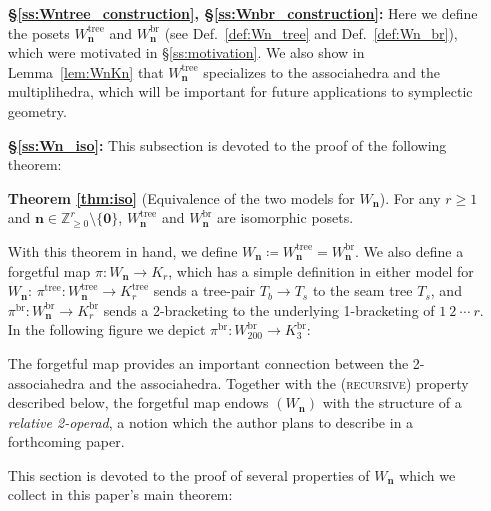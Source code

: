 \documentclass[11pt]{amsart}
\theoremstyle{definition}
\theoremstyle{remark}
\theoremstyle{plain}
\newcommand{\bZ}{\mathbb{Z}}
\newcommand\bn{\mathbf{n}}
\newcommand\bzero{\mathbf{0}}
\newcommand{\on}{\operatorname}
\newcommand{\tree}{{\on{tree}}}
\newcommand{\br}{{\on{br}}}
\begin{document}
\begin{enumerate}
\item[\bf\S\ref{ss:Wntree_construction}, \bf\S\ref{ss:Wnbr_construction}:]
Here we define the posets $W_\bn^\tree$ and $W_\bn^\br$ (see Def.~\ref{def:Wn_tree} and Def.~\ref{def:Wn_br}), which were motivated in \S\ref{ss:motivation}.
We also show in Lemma~\ref{lem:WnKn} that $W_\bn^\tree$ specializes to the associahedra and the multiplihedra, which will be important for future applications to symplectic geometry.

\medskip

\item[\bf\S\ref{ss:Wn_iso}:]
This subsection is devoted to the proof of the following theorem:

\medskip
\noindent
{\bf Theorem \ref{thm:iso}} (Equivalence of the two models for $W_\bn$).
For any $r\geq 1$ and $\bn \in \bZ_{\geq0}^r\setminus\{\bzero\}$, $W_\bn^\tree$ and $W_\bn^\br$ are isomorphic posets.
\medskip

\noindent
With this theorem in hand, we define $W_\bn \coloneqq W_\bn^\tree = W_\bn^\br$.
We also define a forgetful map $\pi\colon W_\bn \to K_r$, which has a simple definition in either model for $W_\bn$: $\pi^\tree\colon W_\bn^\tree \to K_r^\tree$ sends a tree-pair $T_b \to T_s$ to the seam tree $T_s$, and $\pi^\br\colon W_\bn^\br \to K_r^\br$ sends a 2-bracketing to the underlying 1-bracketing of $1\:2\:\cdots\: r$.
In the following figure we depict $\pi^\br\colon W_{200}^\br \to K_3^\br$:

\begin{figure}[H]
\centering
\def\svgwidth{0.65\columnwidth}

\end{figure}

\noindent
The forgetful map provides an important connection between the 2-associahedra and the associahedra.
Together with the \textsc{(recursive)} property described below, the forgetful map endows $(W_\bn)$ with the structure of a {\textit{relative 2-operad}}, a notion which the author plans to describe in a forthcoming paper.

\medskip

\noindent{\bf\S\ref{sec:Wn_polytope}:}
This section is devoted to the proof of several properties of $W_\bn$ which we collect in this paper's main theorem:

\medskip


\end{enumerate}
\end{document}
